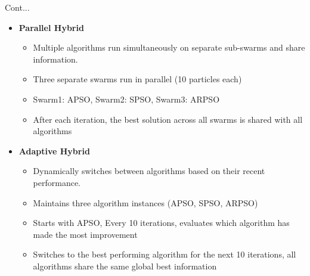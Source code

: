 \documentclass[aspectratio=169]{beamer}
\begin{document}
\begin{frame}{Cont...}
    \begin{itemize}
        \item \textbf{Parallel Hybrid}
        \begin{itemize}
            \item Multiple algorithms run simultaneously on separate sub-swarms and share information.
            \item Three separate swarms run in parallel (10 particles each)
            \item Swarm1: APSO, Swarm2: SPSO, Swarm3: ARPSO
            \item After each iteration, the best solution across all swarms is shared with all algorithms
        \end{itemize}

        \item \textbf{Adaptive Hybrid}
        \begin{itemize}
            \item Dynamically switches between algorithms based on their recent performance.
            \item Maintains three algorithm instances (APSO, SPSO, ARPSO)
            \item Starts with APSO, Every 10 iterations, evaluates which algorithm has made the most improvement
            \item Switches to the best performing algorithm for the next 10 iterations, all algorithms share the same global best information
        \end{itemize}
    \end{itemize}
\end{frame}
\end{document}
